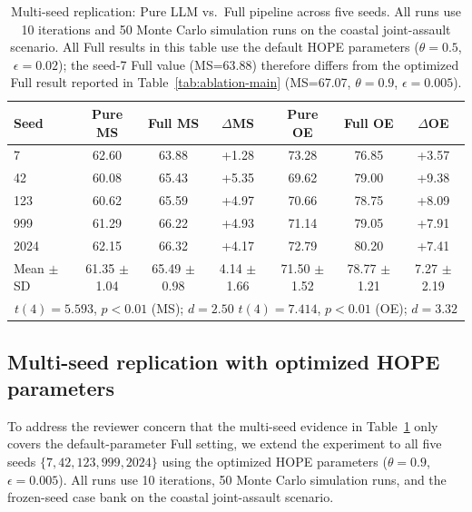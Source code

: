 \begin{table}[ht]
\centering
\caption{Multi-seed replication: Pure LLM vs.\ Full pipeline across five seeds. All runs use 10 iterations and 50 Monte Carlo simulation runs on the coastal joint-assault scenario. All Full results in this table use the default HOPE parameters ($\theta=0.5$, $\epsilon=0.02$); the seed-7 Full value (MS=63.88) therefore differs from the optimized Full result reported in Table~\ref{tab:ablation-main} (MS=67.07, $\theta=0.9$, $\epsilon=0.005$).}
\label{tab:multiseed}
\footnotesize
\setlength{\tabcolsep}{2.8pt}
\begin{tabular}{lcccccc}
\toprule
Seed & Pure MS & Full MS & $\Delta$MS & Pure OE & Full OE & $\Delta$OE \\
\midrule
7 & 62.60 & 63.88 & +1.28 & 73.28 & 76.85 & +3.57 \\
42 & 60.08 & 65.43 & +5.35 & 69.62 & 79.00 & +9.38 \\
123 & 60.62 & 65.59 & +4.97 & 70.66 & 78.75 & +8.09 \\
999 & 61.29 & 66.22 & +4.93 & 71.14 & 79.05 & +7.91 \\
2024 & 62.15 & 66.32 & +4.17 & 72.79 & 80.20 & +7.41 \\
\midrule
Mean $\pm$ SD & \shortstack{61.35\\$\pm$1.04} & \shortstack{65.49\\$\pm$0.98} & \shortstack{4.14\\$\pm$1.66} & \shortstack{71.50\\$\pm$1.52} & \shortstack{78.77\\$\pm$1.21} & \shortstack{7.27\\$\pm$2.19} \\
\midrule
\multicolumn{7}{c}{\footnotesize $t(4)=5.593$, $p<0.01$ (MS); $d=2.50$ \hspace{1em} $t(4)=7.414$, $p<0.01$ (OE); $d=3.32$} \\
\bottomrule
\end{tabular}
\end{table}

\subsection{Multi-seed replication with optimized HOPE parameters}

To address the reviewer concern that the multi-seed evidence in Table~\ref{tab:multiseed} only covers the default-parameter Full setting, we extend the experiment to all five seeds $\{7, 42, 123, 999, 2024\}$ using the optimized HOPE parameters ($\theta=0.9$, $\epsilon=0.005$). All runs use 10 iterations, 50 Monte Carlo simulation runs, and the frozen-seed case bank on the coastal joint-assault scenario.

